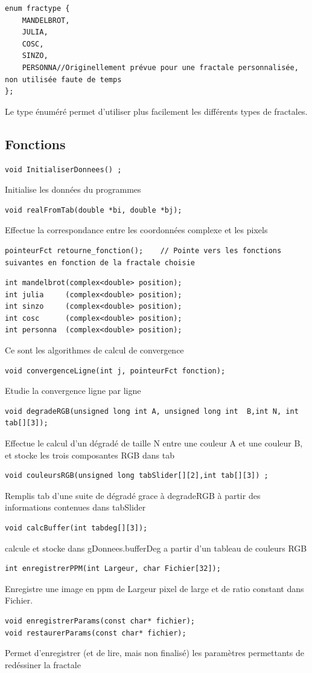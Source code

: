 \documentclass[a4paper,11pt]{article} \usepackage[T1]{fontenc} \usepackage[utf8]{inputenc} \usepackage[francais]{babel}
\begin{document}
\begin{lstlisting}
enum fractype {
    MANDELBROT,
    JULIA,
    COSC,
    SINZO,
    PERSONNA//Originellement prévue pour une fractale personnalisée, non utilisée faute de temps
};
\end{lstlisting}
Le type énuméré permet d'utiliser plus facilement les différents types de fractales.


\subsection{Fonctions }
\begin{lstlisting}
void InitialiserDonnees() ;
\end{lstlisting}
Initialise les données du programmes
\begin{lstlisting}
void realFromTab(double *bi, double *bj);
\end{lstlisting}
Effectue la correspondance entre les coordonnées complexe et les pixels
\begin{lstlisting}
pointeurFct retourne_fonction();    // Pointe vers les fonctions suivantes en fonction de la fractale choisie
\end{lstlisting}
\begin{lstlisting}
int mandelbrot(complex<double> position);
int julia     (complex<double> position);
int sinzo     (complex<double> position);
int cosc      (complex<double> position);
int personna  (complex<double> position);
\end{lstlisting}
Ce sont les algorithmes de calcul de convergence
\begin{lstlisting}
void convergenceLigne(int j, pointeurFct fonction);
\end{lstlisting}
Etudie la convergence ligne par ligne
\begin{lstlisting}
void degradeRGB(unsigned long int A, unsigned long int  B,int N, int tab[][3]);
\end{lstlisting}
Effectue le calcul d'un dégradé de taille N entre une couleur A et une couleur B, et stocke les trois composantes RGB dans tab
\begin{lstlisting}
void couleursRGB(unsigned long tabSlider[][2],int tab[][3]) ;
\end{lstlisting}
Remplis tab d'une suite de dégradé grace à degradeRGB à partir des informations contenues dans tabSlider
\begin{lstlisting}
void calcBuffer(int tabdeg[][3]);
\end{lstlisting}
calcule et stocke dans gDonnees.bufferDeg a partir d'un tableau de couleurs RGB
\begin{lstlisting}
int enregistrerPPM(int Largeur, char Fichier[32]);
\end{lstlisting}
Enregistre une image en ppm de Largeur pixel de large et de ratio constant dans Fichier.
\begin{lstlisting}
void enregistrerParams(const char* fichier);
void restaurerParams(const char* fichier);
\end{lstlisting}
Permet d'enregistrer (et de lire, mais non finalisé) les paramètres permettants de redéssiner la fractale
\end{document}
